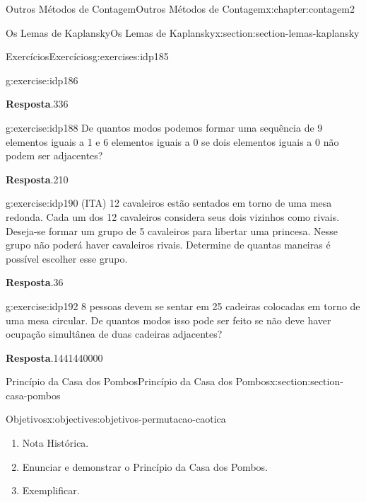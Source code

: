 \documentclass[oneside,10pt,]{book}
\newcommand{\blocktitlefont}{\relax}
\numberwithin{equation}{section}
\begin{document}
\begin{chapterptx}{Outros Métodos de Contagem}{}{Outros Métodos de Contagem}{}{}{x:chapter:contagem2}
\begin{sectionptx}{Os Lemas de Kaplansky}{}{Os Lemas de Kaplansky}{}{}{x:section:section-lemas-kaplansky}
\begin{exercises-subsection}{Exercícios}{}{Exercícios}{}{}{g:exercises:idp185}
\begin{divisionexercise}{1}{}{}{g:exercise:idp186}
\par\smallskip%
\noindent\textbf{\blocktitlefont Resposta}.\hypertarget{g:answer:idp187}{}\quad{}336%
\end{divisionexercise}%
\begin{divisionexercise}{2}{}{}{g:exercise:idp188}%
De quantos modos podemos formar uma sequência de 9 elementos iguais a 1 e 6 elementos iguais a 0 se dois elementos iguais a 0 não podem ser adjacentes?%
\par\smallskip%
\noindent\textbf{\blocktitlefont Resposta}.\hypertarget{g:answer:idp189}{}\quad{}210%
\end{divisionexercise}%
\begin{divisionexercise}{3}{}{}{g:exercise:idp190}%
(ITA) 12 cavaleiros estão sentados em torno de uma mesa redonda. Cada um dos 12 cavaleiros considera seus dois vizinhos como rivais. Deseja-se formar um grupo de 5 cavaleiros para libertar uma princesa. Nesse grupo não poderá haver cavaleiros rivais. Determine de quantas maneiras é possível escolher esse grupo.%
\par\smallskip%
\noindent\textbf{\blocktitlefont Resposta}.\hypertarget{g:answer:idp191}{}\quad{}36%
\end{divisionexercise}%
\begin{divisionexercise}{4}{}{}{g:exercise:idp192}%
8 pessoas devem se sentar em 25 cadeiras colocadas em torno de uma mesa circular. De quantos modos isso pode ser feito se não deve haver ocupação simultânea de duas cadeiras adjacentes?%
\par\smallskip%
\noindent\textbf{\blocktitlefont Resposta}.\hypertarget{g:answer:idp193}{}\quad{}1441440000%
\end{divisionexercise}%
\end{exercises-subsection}
\end{sectionptx}
%
%
\typeout{************************************************}
\typeout{************************************************}
%
\begin{sectionptx}{Princípio da Casa dos Pombos}{}{Princípio da Casa dos Pombos}{}{}{x:section:section-casa-pombos}
\begin{objectives}{Objetivos}{x:objectives:objetivos-permutacao-caotica}
%
\begin{enumerate}
\item{}Nota Histórica.%
\item{}Enunciar e demonstrar o Princípio da Casa dos Pombos.%
\item{}Exemplificar.%

\end{enumerate}
\end{objectives}
\end{sectionptx}
\end{chapterptx}
\end{document}
